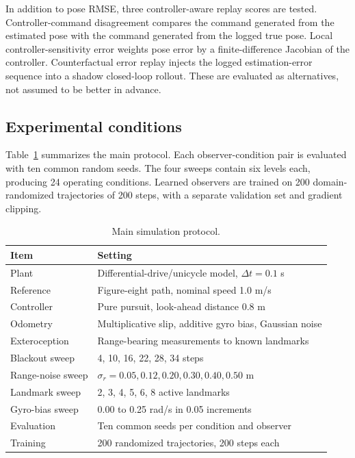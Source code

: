 \documentclass[11pt]{article}
\begin{document}
In addition to pose RMSE, three controller-aware replay scores are tested. Controller-command disagreement compares the command generated from the estimated pose with the command generated from the logged true pose. Local controller-sensitivity error weights pose error by a finite-difference Jacobian of the controller. Counterfactual error replay injects the logged estimation-error sequence into a shadow closed-loop rollout. These are evaluated as alternatives, not assumed to be better in advance.

\subsection{Experimental conditions}
Table~\ref{tab:setup} summarizes the main protocol. Each observer-condition pair is evaluated with ten common random seeds. The four sweeps contain six levels each, producing 24 operating conditions. Learned observers are trained on 200 domain-randomized trajectories of 200 steps, with a separate validation set and gradient clipping.

\begin{table}[H]
\centering
\caption{Main simulation protocol.}
\label{tab:setup}
\begin{tabularx}{0.95\linewidth}{lX}
\toprule
Item & Setting \\
\midrule
Plant & Differential-drive/unicycle model, $\Delta t=0.1$ s \\
Reference & Figure-eight path, nominal speed 1.0 m/s \\
Controller & Pure pursuit, look-ahead distance 0.8 m \\
Odometry & Multiplicative slip, additive gyro bias, Gaussian noise \\
Exteroception & Range-bearing measurements to known landmarks \\
Blackout sweep & 4, 10, 16, 22, 28, 34 steps \\
Range-noise sweep & $\sigma_r=0.05,0.12,0.20,0.30,0.40,0.50$ m \\
Landmark sweep & 2, 3, 4, 5, 6, 8 active landmarks \\
Gyro-bias sweep & 0.00 to 0.25 rad/s in 0.05 increments \\
Evaluation & Ten common seeds per condition and observer \\
Training & 200 randomized trajectories, 200 steps each \\
\bottomrule
\end{tabularx}
\end{table}
\end{document}
